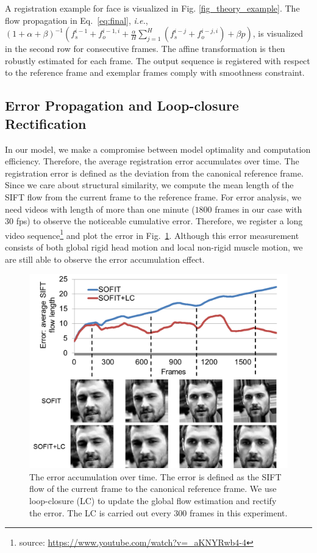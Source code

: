 \documentclass[10pt,journal]{IEEEtran}
\begin{document}
A registration example for face is visualized in Fig. \ref{fig_theory_example}. The flow propagation in Eq.~\eqref{eq:final}, \textit{i.e.}, $(1+\alpha+\beta)^{-1}(f_s^{i-1}+f_o^{i-1,i}+\frac{\alpha}{H}\sum_{j=1}^H(f_s^{i-j}+f_o^{i-j,i})+\beta{p})$, is visualized in the second row for consecutive frames. The affine transformation is then robustly estimated for each frame. The output sequence is registered with respect to the reference frame and exemplar frames comply with smoothness constraint. 


\subsection{\label{sec:details}Error Propagation and Loop-closure Rectification}

In our model, we make a compromise between model optimality and computation efficiency. Therefore, the average registration error accumulates over time. The registration error is defined as the deviation from the canonical reference frame. Since we care about structural similarity, we compute the mean length of the SIFT flow from the current frame to the reference frame. For error analysis, we need videos with length of more than one minute ($1800$ frames in our case with $30$ fps) to observe the noticeable cumulative error. Therefore, we register a long video sequence\footnote{source: \url{https://www.youtube.com/watch?v=_aKNYRwb4-4}} and plot the error in Fig.~\ref{fig_error_prop}. Although this error measurement consists of both global rigid head motion and local non-rigid muscle motion, we are still able to observe the error accumulation effect.

\begin{figure}[htbp]
	\centering
		\includegraphics[width=.9\columnwidth]{fig/error_prop.png}
	\caption{The error accumulation over time. The error is defined as the SIFT flow of the current frame to the canonical reference frame. We use loop-closure (LC) to update the global flow estimation and rectify the error. The LC is carried out every $300$ frames in this experiment.}
	\label{fig_error_prop}
\end{figure}
\end{document}

